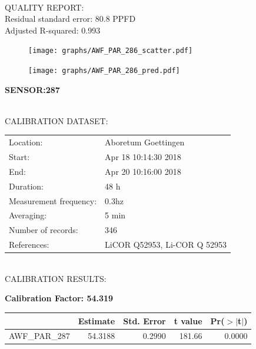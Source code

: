 \documentclass[oneside]{report}
\begin{document}
\hrulefill\\
QUALITY REPORT:\\
Residual standard error: 80.8 PPFD\\
Adjusted R-squared: 0.993



\begin{figure}[H]
  \centering
  \texttt{[image: graphs/AWF\_PAR\_286\_scatter.pdf]}
\end{figure}




\begin{figure}[H]
  \centering
  \texttt{[image: graphs/AWF\_PAR\_286\_pred.pdf]}
\end{figure}

\pagebreak


\begin{center}
\large{\textbf{SENSOR:287}}\\
\end{center}

\hrulefill\\
CALIBRATION DATASET:\\
\begin{table}[h!]
  \centering
  \label{tab:table1}
  \begin{tabular}{ll}
    Location: & Aboretum Goettingen\\ 
    
    
    Start:  & Apr 18 10:14:30 2018 \\
    End:   & Apr 20 10:16:00 2018\\ 
    Duration: & 48 h\\
    Measurement frequency: & 0.3hz\\
    Averaging:  &5 min\\
    Number of records: & 346 \\
    References: & LiCOR Q52953, Li-COR Q 52953 \\
  \end{tabular}
\end{table}

\hrulefill\\
CALIBRATION RESULTS:\\


\begin{center}
\textbf{\large{Calibration Factor: 54.319}}\\
\end{center}
\begin{table}[ht]
\centering
\begin{tabular}{rrrrr}
  \hline
 & Estimate & Std. Error & t value & Pr($>$$|$t$|$) \\ 
  \hline
AWF\_PAR\_287 & 54.3188 & 0.2990 & 181.66 & 0.0000 \\ 
   \hline
\end{tabular}
\end{table}
\end{document}
